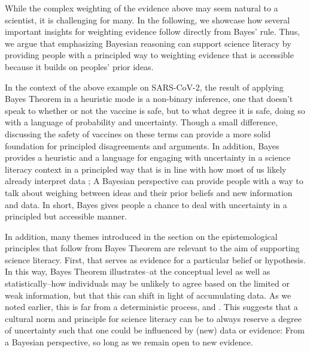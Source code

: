 \documentclass[man]{apa7}
\begin{document}
While the complex weighting of the evidence above may seem natural to a scientist, it is challenging for many. In the following, we showcase how several important insights for weighting evidence follow directly from Bayes' rule. Thus, we argue that emphasizing Bayesian reasoning can support science literacy by providing people with a principled way to weighting evidence that is accessible because it builds on peoples' prior ideas.

In the context of the above example on SARS-CoV-2, the result of applying Bayes Theorem in a heuristic mode is a non-binary inference, one that doesn't speak to whether or not the vaccine is safe, but to what degree it is safe, doing so with a language of probability and uncertainty. Though a small difference, discussing the safety of vaccines on these terms can provide a more solid foundation for principled disagreements and arguments. In addition, Bayes provides a heuristic and a language for engaging with uncertainty in a science literacy context in a principled way that is in line with how most of us likely already interpret data \parencite{tgk06, gw12, gh95}; A Bayesian perspective can provide people with a way to talk about weighing between ideas and their prior beliefs and new information and data. In short, Bayes gives people a chance to deal with uncertainty in a principled but accessible manner.

In addition, many themes introduced in the section on the epistemological principles that follow from Bayes Theorem are relevant to the aim of supporting science literacy. First,  that serves as evidence for a particular belief or hypothesis. In this way, Bayes Theorem illustrates--at the conceptual level as well as statistically--how individuals may be unlikely to agree based on the limited or weak information, but that this can shift in light of accumulating data. As we noted earlier, this is far from a deterministic process, and . This suggests that a cultural norm and principle for science literacy can be to always reserve a degree of uncertainty such that one could be influenced by (new) data or evidence: From a Bayesian perspective,  so long as we remain open to new evidence.
\end{document}
